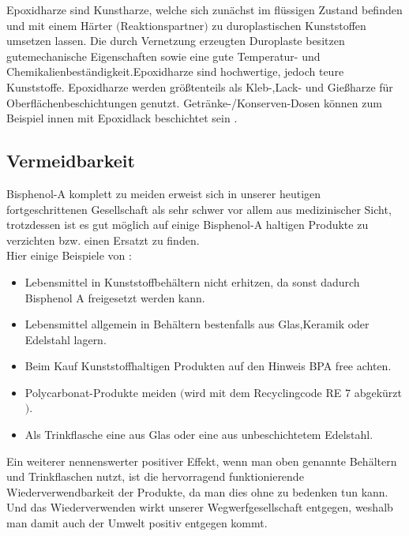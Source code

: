 Epoxidharze sind Kunstharze, welche sich zunächst im flüssigen Zustand befinden
und mit einem Härter $($Reaktionspartner$)$ zu duroplastischen Kunststoffen
umsetzen lassen\cite{Umweltbundesamt2016}. \glqq Die durch Vernetzung erzeugten
Duroplaste besitzen gutemechanische Eigenschaften sowie eine gute Temperatur- 
und Chemikalienbeständigkeit.Epoxidharze sind 
hochwertige, jedoch teure Kunststoffe. Epoxidharze werden größtenteils \glqq als 
Kleb-,Lack- und Gießharze für Oberflächenbeschichtungen genutzt.
Getränke-/Konserven-Dosen können zum Beispiel innen mit Epoxidlack beschichtet sein \cite{Bund}.
\subsection{Vermeidbarkeit}
Bisphenol-A komplett zu meiden erweist sich in unserer heutigen 
fortgeschrittenen Gesellschaft als sehr schwer vor allem aus medizinischer
Sicht, trotzdessen ist es gut möglich auf einige Bisphenol-A haltigen
Produkte zu verzichten bzw. einen Ersatzt zu finden.\\
Hier einige Beispiele von \cite{Utopia}:
\begin{itemize}
    \item Lebensmittel in Kunststoffbehältern nicht erhitzen, da sonst dadurch Bisphenol A freigesetzt werden kann.
    \item Lebensmittel allgemein in Behältern bestenfalls aus Glas,Keramik oder Edelstahl lagern.
    \item Beim Kauf Kunststoffhaltigen Produkten auf den Hinweis \glqq BPA free\grqq{} achten.
    \item Polycarbonat-Produkte meiden $($wird mit dem Recyclingcode RE 7 abgekürzt$)$.
    \item Als Trinkflasche eine aus Glas oder eine aus unbeschichtetem Edelstahl.
\end{itemize}
Ein weiterer nennenswerter positiver Effekt, wenn man oben genannte Behältern
und Trinkflaschen nutzt, ist die hervorragend funktionierende Wiederverwendbarkeit
der Produkte, da man dies ohne zu bedenken tun kann. Und das Wiederverwenden wirkt
unserer \glqq Wegwerfgesellschaft\grqq{} entgegen, weshalb man damit auch der Umwelt
positiv entgegen kommt.
